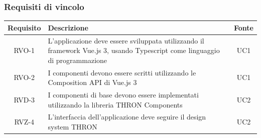 \subsubsection{Requisiti di vincolo}


\begin{center}
\label{tab:requisiti-vincolo}
\begin{longtable}{|c|p{}|c|}
\hline
\textbf{Requisito} & \textbf{Descrizione} & \textbf{Fonte}\\
\hline
RVO-1 & L'applicazione deve essere sviluppata utilizzando il framework Vue.js 3, usando Typescript come linguaggio di programmazione & UC1 \\
\hline
RVO-2 & I componenti devono essere scritti utilizzando le Composition API di Vue.js 3 & UC1 \\
\hline
RVD-3 & I componenti di base devono essere implementati utilizzando la libreria THRON Components & UC2 \\
\hline
RVZ-4 & L'interfaccia dell'applicazione deve seguire il design system THRON & UC2 \\
\hline
\end{longtable}
\end{center}